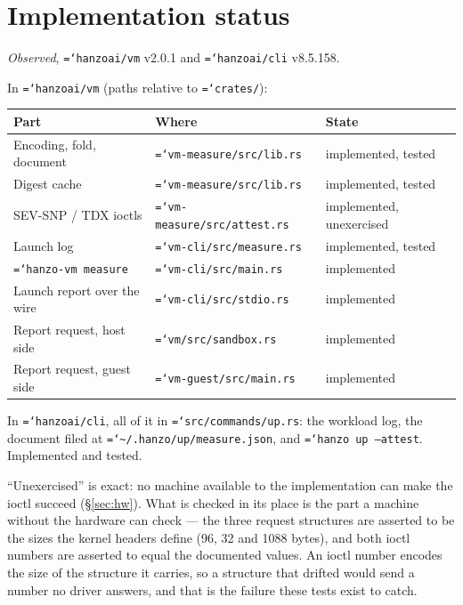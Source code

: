 \documentclass[11pt,a4paper]{article}
\newcommand{\code}[1]{\texttt{\hyphenchar\font=`\-\relax #1}}
\begin{document}
\section{Implementation status}
\label{sec:status}

\emph{Observed}, \code{hanzoai/vm} v2.0.1 and \code{hanzoai/cli} v8.5.158.

In \code{hanzoai/vm} (paths relative to \code{crates/}):

\begin{center}
\begin{tabular}{@{}lll@{}}
\toprule
Part & Where & State \\
\midrule
Encoding, fold, document    & \code{vm-measure/src/lib.rs}    & implemented, tested \\
Digest cache                & \code{vm-measure/src/lib.rs}    & implemented, tested \\
SEV-SNP / TDX ioctls        & \code{vm-measure/src/attest.rs} & implemented, unexercised \\
Launch log                  & \code{vm-cli/src/measure.rs}    & implemented, tested \\
\code{hanzo-vm measure}     & \code{vm-cli/src/main.rs}       & implemented \\
Launch report over the wire & \code{vm-cli/src/stdio.rs}      & implemented \\
Report request, host side   & \code{vm/src/sandbox.rs}        & implemented \\
Report request, guest side  & \code{vm-guest/src/main.rs}     & implemented \\
\bottomrule
\end{tabular}
\end{center}

\noindent In \code{hanzoai/cli}, all of it in \code{src/commands/up.rs}: the
workload log, the document filed at \code{\textasciitilde/.hanzo/up/measure.json},
and \code{hanzo up --attest}. Implemented and tested.

``Unexercised'' is exact: no machine available to the implementation can make the
ioctl succeed (\S\ref{sec:hw}). What is checked in its place is the part a machine
without the hardware can check --- the three request structures are asserted to be
the sizes the kernel headers define (96, 32 and 1088 bytes), and both ioctl numbers
are asserted to equal the documented values. An ioctl number encodes the size of
the structure it carries, so a structure that drifted would send a number no driver
answers, and that is the failure these tests exist to catch.
\end{document}
